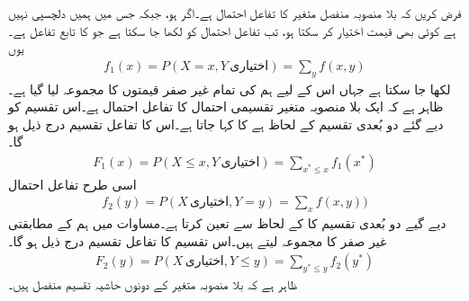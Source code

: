 فرض کریں کہ بلا منصوبہ منفصل متغیر  کا تفاعل احتمال  ہے۔اگر  ہو، جبکہ  جس میں ہمیں دلچسپی نہیں ہے کوئی بھی قیمت اختیار کر سکتا ہو، تب تفاعل احتمال  کو  لکھا جا سکتا ہے جو  کا تابع تفاعل ہے۔یوں 
\begin{align}\label{مساوات_شماریات_حاشیہ_الف}
f_1(x)=P(X=x,Y\,\text{اختیاری})=\sum_y f(x,y)
\end{align} 
لکھا جا سکتا ہے جہاں اس  کے لیے ہم  کی  تمام غیر صفر قیمتوں کا مجموعہ لیا گیا ہے۔ظاہر ہے کہ  ایک بلا منصوبہ متغیر تقسیمی احتمال کا تفاعل احتمال ہے۔اس تقسیم کو دیے گئے دو بُعدی تقسیم کے لحاظ ہے  کا  کہا جاتا ہے۔اس کا تفاعل تقسیم درج ذیل ہو گا۔
\begin{align}\label{مساوات_شماریات_حاشیہ_ب}
F_1(x)=P(X\le x,Y\, \text{اختیاری})=\sum_{x^*\le x} f_1(x^*)
\end{align}
اسی طرح تفاعل احتمال 
\begin{align}\label{مساوات_شماریات_حاشیہ_پ}
f_2(y)=P(X\,\text{اختیاری}, Y=y)=\sum_x f(x,y))
\end{align}
دیے گیے دو بُعدی تقسیم کا  کے لحاظ سے  تعین کرتا ہے۔مساوات  میں ہم  کے مطابقتی غیر صفر  کا مجموعہ لیتے ہیں۔اس تقسیم کا تفاعل تقسیم درج ذیل ہو گا۔
\begin{align}
F_2(y)=P(X\,\text{اختیاری},Y\le y)=\sum_{y^*\le y}f_2(y^*)
\end{align}
ظاہر ہے کہ بلا منصوبہ متغیر  کے دونوں حاشیہ تقسیم  منفصل ہیں۔

